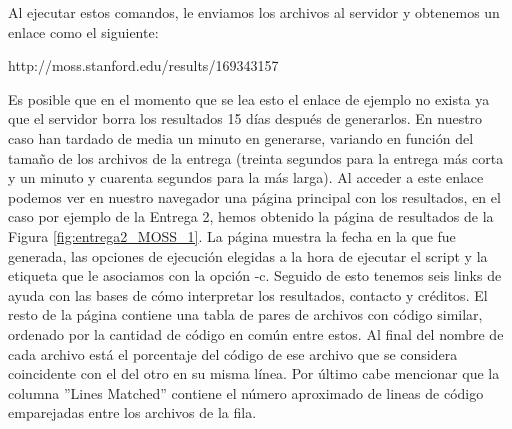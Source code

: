 Al ejecutar estos comandos, le enviamos los archivos al servidor y obtenemos un enlace como el siguiente:
\begin{center}
http://moss.stanford.edu/results/169343157
\end{center}
Es posible que en el momento que se lea esto el enlace de ejemplo no exista ya que el servidor borra los resultados 15 días después de generarlos.
\newline
En nuestro caso han tardado de media un minuto en generarse, variando en función del tamaño de los archivos de la entrega (treinta segundos para la entrega más corta y un minuto y cuarenta segundos para la más larga). 
\newline
Al acceder a este enlace podemos ver en nuestro navegador una página principal con los resultados, en el caso por ejemplo de la Entrega 2, hemos obtenido la página de resultados de la Figura \ref{fig:entrega2_MOSS_1}.
\newline
La página muestra la fecha en la que fue generada, las opciones de ejecución elegidas a la hora de ejecutar el script y la etiqueta que le asociamos con la opción -c.
\newline
Seguido de esto tenemos seis links de ayuda con las bases de cómo interpretar los resultados, contacto y créditos.
\newline
El resto de la página contiene una tabla de pares de archivos con código similar, ordenado por la cantidad de código en común entre estos.
\newline
Al final del nombre de cada archivo está el porcentaje del código de ese archivo que se considera coincidente con el del otro en su misma línea.
\newline
Por último cabe mencionar que la columna ''Lines Matched'' contiene el número aproximado de lineas de código emparejadas entre los archivos de la fila.


